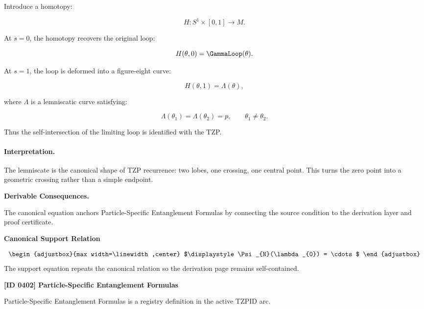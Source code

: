Introduce a homotopy:

\begin{equation}
H:S^1\times[0,1]\to M .
\end{equation}

At $s=0$, the homotopy recovers the original loop:

\begin{equation}
H(\theta,0)=\GammaLoop(\theta).
\end{equation}

At $s=1$, the loop is deformed into a figure-eight curve:

\begin{equation}
H(\theta,1)=\Lambda(\theta),
\end{equation}

where $\Lambda$ is a lemniscatic curve satisfying:

\begin{equation}
\Lambda(\theta_1)=\Lambda(\theta_2)=p,
\qquad
\theta_1\neq\theta_2 .
\end{equation}

Thus the self-intersection of the limiting loop is identified with the TZP.

\paragraph{Interpretation.}
The lemniscate is the canonical shape of TZP recurrence: two lobes, one crossing, one central point. This turns the zero point into a geometric crossing rather than a simple endpoint.

\par\vspace{0.35em}
\noindent\textbf{Derivable Consequences.}\quad
\begingroup
\footnotesize
\raggedright
The canonical equation anchors Particle-Specific Entanglement Formulas by connecting the source condition to the derivation layer and proof certificate.
\par\endgroup

\noindent\textbf{Canonical Support Relation}\par
\[
\begin{adjustbox}{max width=\linewidth,center}
$\displaystyle
\Psi_{N}(\lambda_{0}) = \cdots
$
\end{adjustbox}
\]
\noindent The support equation repeats the canonical relation so the derivation page remains self-contained.\par

\clearpage
\noindent\textbf{[ID 0402] Particle-Specific Entanglement Formulas}\par
\vspace{0.35em}
\begingroup\small
{}
Particle-Specific Entanglement Formulas is a registry definition in the active TZPID arc.

